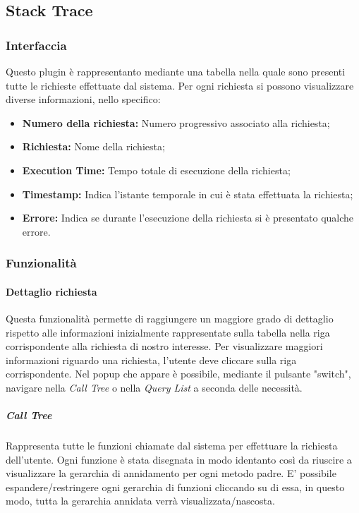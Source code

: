 \subsection{Stack Trace}
\label{sec:strace}
\subsubsection{Interfaccia}
Questo plugin è rappresentanto mediante una tabella nella quale sono presenti tutte le richieste effettuate dal sistema. Per ogni richiesta si possono visualizzare diverse informazioni, nello specifico:
   
    \begin{itemize}
    	
    	\item \textbf{Numero della richiesta:} Numero progressivo associato alla richiesta;
    	\item \textbf{Richiesta:} Nome della richiesta;
    	\item \textbf{Execution Time:} Tempo totale di esecuzione della richiesta;
    	\item \textbf{Timestamp:} Indica l'istante temporale in cui è stata effettuata la richiesta;
    	\item \textbf{Errore:} Indica se durante l'esecuzione della richiesta si è presentato qualche errore.
    	
    	\end{itemize}

\subsubsection{Funzionalità}
\paragraph {Dettaglio richiesta} \Spazio
Questa funzionalità permette di raggiungere un maggiore grado di dettaglio rispetto alle informazioni inizialmente rappresentate sulla tabella nella riga corrispondente alla richiesta di nostro interesse.
Per visualizzare maggiori informazioni riguardo una richiesta, l'utente deve cliccare sulla riga corrispondente.
Nel popup che appare è possibile, mediante il pulsante "switch", navigare nella \emph{Call Tree} o nella \emph{Query List} a seconda delle necessità.

\subparagraph {Call Tree} \Spazio
Rappresenta tutte le funzioni chiamate dal sistema per effettuare la richiesta dell'utente.
Ogni funzione è stata disegnata in modo identanto così da riuscire a visualizzare la gerarchia di annidamento per ogni metodo padre.
E' possibile espandere/restringere ogni gerarchia di funzioni cliccando su di essa, in questo modo, tutta la gerarchia annidata verrà visualizzata/nascosta.

